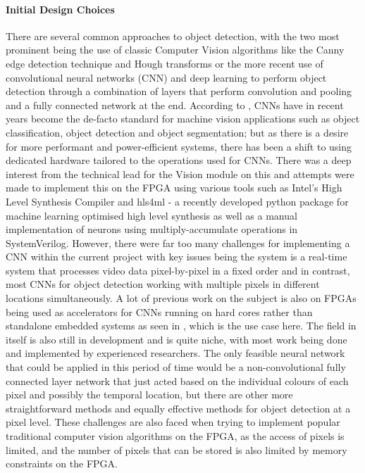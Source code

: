 \documentclass[a4paper]{article}
\begin{document}
\paragraph*{Initial Design Choices}
\vspace{-6pt}
There are several common approaches to object detection, with the two most 
prominent being the use of classic Computer Vision algorithms like the Canny edge
detection technique and Hough transforms or the more recent use of convolutional
neural networks (CNN) and deep learning to perform object detection through a 
combination of layers that perform convolution and pooling and a fully connected network
at the end. 
According to \cite{DBLP:journals/corr/abs-1806-01683}, CNNs have in recent years 
become the de-facto standard for machine vision applications such as object 
classification, object detection and object segmentation; but as there is a desire 
for more performant and power-efficient systems, there has been a shift to 
using dedicated hardware tailored to the operations used for CNNs. There was a 
deep interest from the technical lead for the Vision module on this and attempts
were made to implement this on the FPGA using various tools such as Intel's High 
Level Synthesis Compiler \cite{IntelHLS} and hls4ml - a recently developed 
python package for machine learning optimised high level synthesis \cite{HLS4ML} 
as well as a manual implementation of neurons using multiply-accumulate operations in SystemVerilog. 
However, there were far too many challenges for implementing a CNN within the 
current project with key issues being the system is a real-time system that 
processes video data pixel-by-pixel in a fixed order and in contrast, most CNNs for object 
detection working with multiple pixels in different locations simultaneously. 
A lot of previous work on the subject is also on FPGAs being used as accelerators for 
CNNs running on hard cores rather than standalone embedded systems as seen in \cite{DBLP:journals/corr/abs-1806-01683}
, which is the use case here. The field in itself is also still in development and is quite niche, 
with most work being done and implemented by experienced researchers. The only feasible neural network that could be applied in this period of time
would be a non-convolutional fully connected layer network that just acted based on the individual colours of each pixel
and possibly the temporal location, but there are other more straightforward methods 
and equally effective methods for object detection at a pixel level. 
These challenges are also faced when trying to implement popular traditional computer vision 
algorithms on the FPGA, as the access of pixels is limited, and the number of pixels that can be
stored is also limited by memory constraints on the FPGA. 
\end{document}
